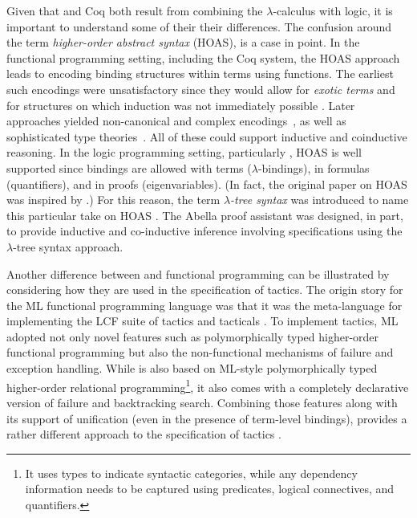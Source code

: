 Given that \lP and Coq both result from combining the
$\lambda$-calculus with logic, it is important to understand some of
their their differences.  The confusion around the term
\emph{higher-order abstract syntax} (HOAS), is a case in point.  In
the functional programming setting, including the Coq system, the HOAS
approach leads to encoding binding structures within terms using
functions.  The earliest such encodings were unsatisfactory since they
would allow for \emph{exotic terms} \cite{despeyroux95tlca} and for
structures on which induction was not immediately possible \cite{roeckl01fossacs}.
Later approaches yielded non-canonical and complex encodings~\cite{chlipala08icfp,honsell01tcs}, as well as sophisticated type theories~\cite{pientka10ijcar}. All of
these could support inductive and coinductive reasoning. 
In the logic programming setting, particularly \lP, HOAS is well
supported since bindings are allowed with terms ($\lambda$-bindings),
in formulas (quantifiers), and in proofs (eigenvariables).  (In fact,
the original paper on HOAS \cite{pfenning88pldi} was inspired by \lP.)
For this reason, the term \emph{$\lambda$-tree syntax} was introduced
to name this particular take on HOAS \cite{miller19jar}.  The Abella
proof assistant \cite{baelde14jfr} was designed, in part, to provide
inductive and co-inductive inference involving specifications using
the $\lambda$-tree syntax approach.

Another difference between \lP and functional programming can be
illustrated by considering how they are used in the specification of
tactics.  The origin story for the ML functional programming language
was that it was the meta-language for implementing the LCF suite of
tactics and tacticals \cite{gordon79}.  To implement tactics, ML
adopted not only novel features such as polymorphically typed
higher-order functional programming but also the non-functional
mechanisms of failure and exception handling.  While \lP is also based
on ML-style polymorphically typed higher-order relational
programming\footnote{It uses types to indicate syntactic categories, while
  any dependency information needs to be captured using predicates,
  logical connectives, and quantifiers.}, it also comes with a
completely declarative version of failure and backtracking search.
Combining those features along with its support of unification (even
in the presence of term-level bindings), \lP provides a rather
different approach to the specification of tactics \cite{felty93jar}.

